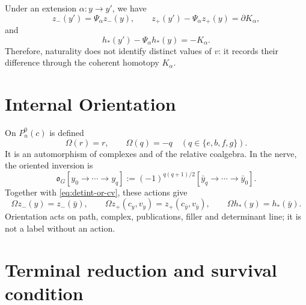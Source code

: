 Under an extension \(\alpha:y\to y'\), we have
\begin{equation}\label{eq:detint-z-natural}
 z_-(y')=\Psi_\alpha z_-(y),
 \qquad
 z_+(y')-\Psi_\alpha z_+(y)=\partial K_\alpha,
\end{equation}
and
\begin{equation}\label{eq:detint-h-natural}
 h_*(y')-\Psi_\alpha h_*(y)=-K_\alpha.
\end{equation}
Therefore, naturality does not identify distinct values of \(v\): it records
their difference through the coherent homotopy \(K_\alpha\).

\section{Internal Orientation}

On \(P_n^0(c)\) is defined
\begin{equation}\label{eq:detint-omega-p}
 \Omega(r)=r,
 \qquad
 \Omega(q)=-q\quad(q\in\{e,b,f,g\}).
\end{equation}
It is an automorphism of complexes and of the relative coalgebra. In the nerve,
the oriented inversion is
\begin{equation}\label{eq:detint-omega-g}
 \mathfrak o_G[y_0\to\cdots\to y_q]
 :=(-1)^{q(q+1)/2}
 [\bar y_q\to\cdots\to\bar y_0].
\end{equation}
Together with \eqref{eq:detint-or-cv}, these actions give
\begin{equation}\label{eq:detint-or-z-h}
 \Omega z_-(y)=z_-(\bar y),
 \qquad
 \Omega z_+(c_y,v_y)=z_+(c_{\bar y},v_{\bar y}),
 \qquad
 \Omega h_*(y)=h_*(\bar y).
\end{equation}
Orientation acts on path, complex, publications, filler and determinant
line; it is not a label without an action.

\section{Terminal reduction and survival condition}
\label{sec:detint-terminal}

